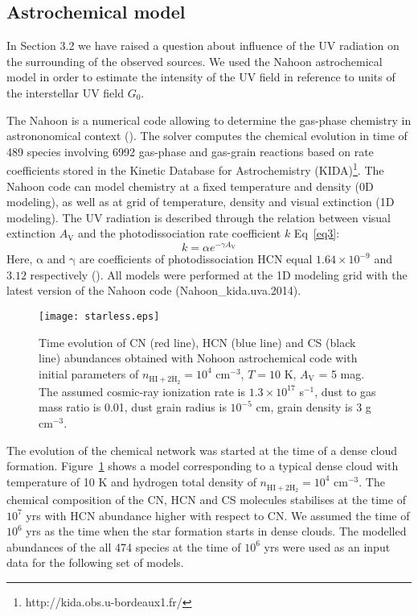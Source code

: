 \documentclass{aa}
\begin{document}
\subsection{Astrochemical model}

In Section 3.2 we have raised a question about influence of the UV radiation on the surrounding of the observed sources. We used the Nahoon astrochemical model in order to estimate the intensity of the UV field in reference to units of the interstellar UV field $G_0$.

The Nahoon is a numerical code allowing to determine the gas-phase chemistry in astrononomical context  (\citealt{Wak12}). The solver computes the chemical evolution in time of 489 species involving 6992 gas-phase and gas-grain reactions based on rate coefficients stored in the Kinetic Database for Astrochemistry (KIDA)\footnote{http://kida.obs.u-bordeaux1.fr/}. The Nahoon code can model chemistry at a fixed temperature and density (0D modeling), as well as at grid of temperature, density and visual extinction (1D modeling). The UV radiation is described through the relation between visual extinction $A_\mathrm{V}$ and the photodissociation rate coefficient $k$ Eq~\ref{eq3}:
\begin{equation} \label{eq3}
k = \alpha e^{-\gamma A_\mathrm{V}}
\end{equation}
Here, $\mathrm{\alpha}$ and $\mathrm{\gamma}$ are coefficients of photodissociation HCN equal $1.64\times10^{-9}$ and $3.12$ respectively (\cite{Hea17}). 
All models were performed at the 1D modeling grid with the latest version of the Nahoon code (Nahoon\_kida.uva.2014).


\begin{figure}
\centering
\texttt{[image: starless.eps]}
\caption{Time evolution of CN (red line), HCN (blue line) and CS (black line) abundances obtained with Nohoon astrochemical code with initial parameters of $n_\mathrm{HI+2 \dot H_2} = 10^4$ cm$^{-3}$, $T = 10$ K, $A_\mathrm{V}$ = 5 mag. The assumed cosmic-ray ionization rate is $1.3\times10^{17}$ s$^{-1}$, dust to gas mass ratio is 0.01, dust grain radius is $10^{-5}$ cm, grain density is 3 g cm$^{-3}$.}
\label{starless}
\end{figure}

The evolution of the chemical network was started at the time of a dense cloud formation. Figure~\ref{starless} shows a model corresponding to a typical dense cloud with temperature of 10 K and hydrogen total density of $n_\mathrm{HI+2 \dot H_2} = 10^4$ cm$^{-3}$. The chemical composition of the CN, HCN and CS molecules stabilises at the time of $10^{7}$ yrs with HCN abundance higher with respect to CN. We assumed the time of $10^{6}$ yrs as the time when the star formation starts in dense clouds. The modelled abundances of the all 474 species at the time of $10^{6}$ yrs were used as an input data for the following set of models.
\end{document}
